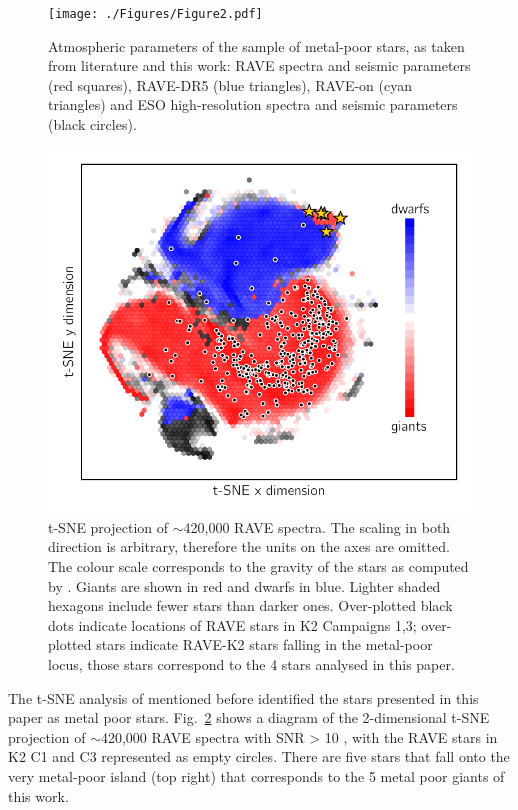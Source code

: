 \documentclass{aa}
\begin{document}
   \begin{figure}
   \centering
   \texttt{[image: ./Figures/Figure2.pdf]}
   \caption{Atmospheric parameters of the sample of metal-poor stars, as taken from literature and this work: RAVE spectra and seismic parameters (red squares), RAVE-DR5 (blue triangles), RAVE-on (cyan triangles) and ESO high-resolution spectra and seismic parameters (black circles). }
              \label{Fig:datalit}%
    \end{figure}
   \begin{figure}
   \centering
   \includegraphics[width=1\columnwidth]{./Figures/Tsne.pdf}
   \caption{t-SNE projection of $\sim$420,000 RAVE spectra. The scaling in both direction is arbitrary,
therefore the units on the axes are omitted. The colour scale corresponds to the gravity of the
stars as computed by \citet{Kunder2017}. Giants are shown in red and dwarfs in blue. Lighter shaded hexagons include fewer stars than darker ones. Over-plotted black dots indicate locations of RAVE stars in K2 Campaigns 1,3; over-plotted stars indicate RAVE-K2 stars falling in the metal-poor locus, those stars correspond to the 4 stars analysed in this paper.}
              \label{Fig:Tsne}%
    \end{figure}
The t-SNE analysis of \cite{MAt2017} mentioned before identified the stars presented in this paper as metal poor stars. Fig.~\ref{Fig:Tsne} shows a diagram of the 2-dimensional t-SNE projection \citep{van2008visualizing} of $\sim$420,000 RAVE spectra with SNR > 10 , with the RAVE stars in K2 C1 and C3 represented as empty circles. There are five stars that fall onto the very metal-poor island (top right) that corresponds to the 5 metal poor giants of this work. 
\end{document}
